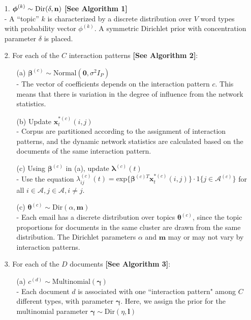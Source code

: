 \documentclass[a4paper]{article}
\begin{document}
\begin{itemize}
	\item[1.] {$\boldsymbol{\phi}^{(k)} \sim \mbox{Dir}(\delta, \bf n)$} \textbf{[See Algorithm 1]}\\
	- A “topic” $k$ is characterized by a discrete distribution over $V$ word types with probability vector $\phi^{(k)}$. A symmetric Dirichlet prior with concentration parameter $\delta$ is placed.
\item[2.] For each of the $C$ interaction patterns \textbf{[See Algorithm 2]}:
\begin{itemize}
	\item[(a)] $\boldsymbol{\beta}^{(c)}\sim \mbox{Normal}(\textbf{0}, \sigma^2I_P)$\\ 
	- The vector of coefficients depends on the interaction pattern $c$. This means that there is variation in the degree of influence from the network statistics.
	\item[(b)] Update $\boldsymbol{x}^{*(c)}_t(i, j)$\\
	- Corpus are partitioned according to the assignment of interaction patterns, and the dynamic network statistics are calculated based on the documents of the same interaction pattern.
	\item[(c)] Using $\boldsymbol{\beta}^{(c)}$ in (a), update $\boldsymbol{\lambda}^{(c)}(t)$\\
	- Use the equation $\lambda^{(c)}_{ij}(t)= \mbox{exp}\Big\{\boldsymbol{\beta}^{(c)T}\boldsymbol{x}^{*(c)}_t(i, j)\Big\}\cdot 1\{j \in \mathcal{A}^{(c)}\}$ for all $i \in \mathcal{A}, j \in \mathcal{A}, i\neq j$.
	\item[(c)] $\boldsymbol{\theta}^{(c)}\sim \mbox{Dir}(\alpha, \textbf{m})$\\
	- Each email has a discrete distribution over topics $\boldsymbol{\theta}^{(c)}$, since the topic proportions for documents in the same cluster are drawn from the same distribution. The Dirichlet parameters $\alpha$ and $\textbf{m}$ may or may not vary by interaction patterns.
\end{itemize}
\item[3.] For each of the $D$ documents \textbf{[See Algorithm 3]}:
\begin{itemize}
	\item[(a)] $c^{(d)}\sim \mbox{Multinomial}(\boldsymbol{\gamma})$\\
	- Each document $d$ is associated with one ``interaction pattern" among $C$ different types, with parameter $\boldsymbol{\gamma}$. Here, we assign the prior for the multinomial parameter $\boldsymbol{\gamma} \sim \mbox{Dir}({\eta}, \boldsymbol{l})$

\end{itemize}
\end{itemize}
\end{document}
